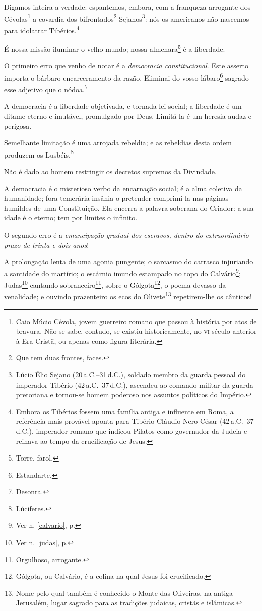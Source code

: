 Digamos inteira a verdade: espantemos, embora, com a franqueza arrogante
dos Cévolas\footnote{Caio Múcio Cévola, jovem guerreiro romano que
  passou à história por atos de bravura. Não se sabe, contudo, se
  existiu historicamente, no \textsc{vi} século anterior à Era Cristã, ou apenas
  como figura literária.} a covardia dos bifrontados\footnote{Que tem
  duas frontes, faces.} Sejanos\footnote{Lúcio Élio Sejano (20\,a.C.--31\,d.C.), 
  soldado membro da guarda pessoal do imperador Tibério (42\,a.C.--37\,d.C.), 
  ascendeu ao comando militar da guarda pretoriana e tornou-se
  homem poderoso nos assuntos políticos do Império.}: nós os americanos
não nascemos para idolatrar Tibérios.\footnote{Embora os Tibérios
  fossem uma família antiga e influente em Roma, a referência mais
  provável aponta para Tibério Cláudio Nero César (42\,a.C.--37\,d.C.),
  imperador romano que indicou Pilatos como governador da Judeia e
  reinava ao tempo da crucificação de Jesus.}

É nossa missão iluminar o velho mundo; nossa almenara\footnote{Torre,
  farol.} é a liberdade.

O primeiro erro que venho de notar é a \emph{democracia constitucional}.
Este asserto importa o bárbaro encarceramento da razão. Eliminai do
vosso lábaro\footnote{Estandarte.} sagrado esse adjetivo que o
nódoa.\footnote{Desonra.}

A democracia é a liberdade objetivada, e tornada lei social; a liberdade
é um ditame eterno e imutável, promulgado por Deus. Limitá-la é um
heresia audaz e perigosa.

Semelhante limitação é uma arrojada rebeldia; e as rebeldias desta ordem
produzem os Lusbéis.\footnote{Lúciferes.}

Não é dado ao homem restringir os decretos supremos da Divindade.

A democracia é o misterioso verbo da encarnação social; é a alma
coletiva da humanidade; fora temerária insânia o pretender comprimi-la
nas páginas humildes de uma Constituição. Ela encerra a palavra soberana
do Criador: a sua idade é o eterno; tem por limites o infinito.

O segundo erro é a \emph{emancipação gradual dos escravos, dentro do
extraordinário prazo de trinta e dois anos}!

A prolongação lenta de uma agonia pungente; o sarcasmo do carrasco
injuriando a santidade do martírio; o escárnio imundo estampado no topo
do Calvário\footnote{Ver n. \ref{calvario}, p. \pageref{calvario}}; 
Judas\footnote{Ver n. \ref{judas}, p. \pageref{judas}} 
  cantando sobranceiro\footnote{Orgulhoso, arrogante.}, sobre
o Gólgota\footnote{Gólgota, ou Calvário, é a colina na qual Jesus foi
  crucificado.}, o poema devasso da venalidade; e ouvindo prazenteiro os
ecos do Olivete\footnote{Nome pelo qual também é conhecido o Monte das
  Oliveiras, na antiga Jerusalém, lugar sagrado para as tradições
  judaicas, cristãs e islâmicas.} repetirem-lhe os cânticos!

